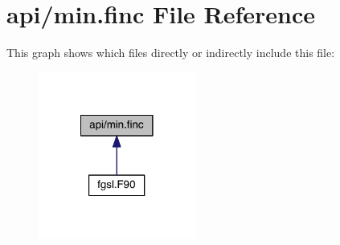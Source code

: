 \hypertarget{min_8finc}{\section{api/min.finc File Reference}
\label{min_8finc}
}
This graph shows which files directly or indirectly include this file\-:
\nopagebreak
\begin{figure}[H]
\begin{center}
\leavevmode
\includegraphics[width=146pt]{min_8finc__dep__incl}
\end{center}
\end{figure}
